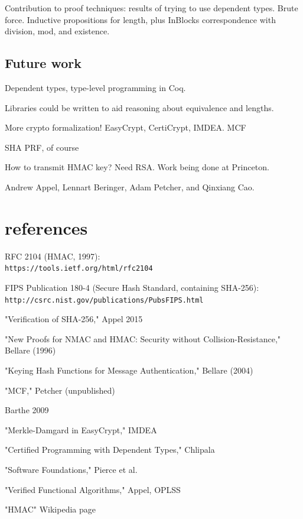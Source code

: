 \documentclass[twocolumn,showpacs,%
  nofootinbib,aps,superscriptaddress,%
  eqsecnum,prd,notitlepage,showkeys,10pt]{revtex4-1}
\begin{document}
Contribution to proof techniques: results of trying to use dependent types. Brute force. Inductive propositions for length, plus InBlocks correspondence with division, mod, and existence.

\subsection{Future work}

Dependent types, type-level programming in Coq.

Libraries could be written to aid reasoning about equivalence and lengths.

More crypto formalization! EasyCrypt, CertiCrypt, IMDEA. MCF

SHA PRF, of course

How to transmit HMAC key? Need RSA. Work being done at Princeton.


\begin{acknowledgments}

Andrew Appel, Lennart Beringer, Adam Petcher, and Qinxiang Cao.

\end{acknowledgments}

\section{references}

RFC 2104 (HMAC, 1997): \\
\verb|https://tools.ietf.org/html/rfc2104|

FIPS Publication 180-4 (Secure Hash Standard, containing SHA-256): \\
\verb|http://csrc.nist.gov/publications/PubsFIPS.html|

"Verification of SHA-256," Appel 2015

"New Proofs for NMAC and HMAC: Security without Collision-Resistance," Bellare (1996)

"Keying Hash Functions for Message Authentication," Bellare (2004)

"MCF," Petcher (unpublished)

Barthe 2009

"Merkle-Damgard in EasyCrypt," IMDEA

"Certified Programming with Dependent Types," Chlipala

"Software Foundations," Pierce et al.

"Verified Functional Algorithms," Appel, OPLSS

"HMAC" Wikipedia page
\end{document}
